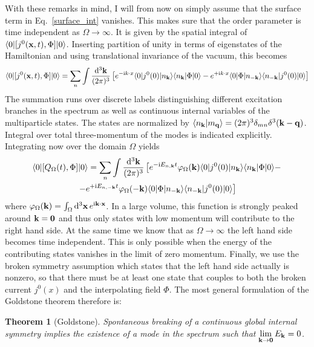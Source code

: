 \documentclass[final,2p,times,12pt,sort&compress]{elsarticle}
\newcommand\vek[1]{{\boldsymbol{\bf #1}}}   %
\newcommand\skal[2]{\vek{#1}\cdot\vek{#2}}  %
\newcommand\bra[1]{\langle#1\vert}          %
\newcommand\ket[1]{\vert#1\rangle}          %
\newcommand\braket[2]{\langle#1\vert#2\rangle} %
\newcommand\imag{\mathrm i}                 %
\newcommand\thname{Theorem}
\newtheorem{theorem}{\thname}
\newcommand\vp{\varphi}
\newcommand\dthree{\mathop{{\rm d}^3\!}\nolimits} %
\begin{document}
With these remarks in mind, I will from now on simply assume that the surface
term in Eq.~\eqref{surface_int} vanishes. This makes sure that the order
parameter is time independent as $\Omega\to\infty$. It is given by the spatial
integral of $\bra0[j^0(\vek x,t),\Phi]\ket0$. Inserting partition of unity in
terms of eigenstates of the Hamiltonian and using translational invariance of
the vacuum, this becomes
\begin{equation}
\bra0[j^0(\vek x,t),\Phi]\ket0=\sum_n\int\frac{\dthree\vek k}{(2\pi)^3}
\left[e^{-\imag k\cdot x}\bra0j^0(0)\ket{n_{\vek k}}\bra{n_{\vek k}}\Phi\ket0-
e^{+\imag k\cdot x}\bra0\Phi\ket{n_{-\vek k}}\bra{n_{-\vek k}}j^0(0)\ket0
\right]
\label{Goldstone_proof}
\end{equation}
The summation runs over discrete labels distinguishing different excitation
branches in the spectrum as well as continuous internal variables of the
multiparticle states. The states are normalized by $\braket{n_{\vek k}}{m_{\vek
q}}=(2\pi)^3\delta_{mn}\delta^3(\vek k-\vek q)$. Integral over total
three-momentum of the modes is indicated explicitly. Integrating now over the
domain $\Omega$ yields
\begin{multline}
\bra0[Q_\Omega(t),\Phi]\ket0=\sum_n\int\frac{\dthree\vek k}{(2\pi)^3}
\left[e^{-\imag E_{n,\vek k}t}\vp_\Omega(\vek k)\bra0j^0(0)
\ket{n_{\vek k}}\bra{n_{\vek k}}\Phi\ket0-\right.\\
\left.-e^{+\imag E_{n,-\vek k}t}\vp_\Omega(-\vek k)
\bra0\Phi\ket{n_{-\vek k}}\bra{n_{-\vek k}}j^0(0)\ket0 \right]
\label{Goldstone_proof2}
\end{multline}
where $\vp_\Omega(\vek k)=\int_\Omega\dthree\vek x\,e^{\imag\skal kx}$. In a
large volume, this function is strongly peaked around $\vek k=\vek0$ and thus
only states with low momentum will contribute to the right hand side. At the
same time we know that as $\Omega\to\infty$ the left hand side becomes time
independent. This is only possible when the energy of the contributing states
vanishes in the limit of zero momentum. Finally, we use the broken symmetry
assumption which states that the left hand side actually is nonzero, so that
there must be at least one state that couples to both the broken current
$j^0(x)$ and the interpolating field $\Phi$. The most general formulation of
the Goldstone theorem therefore is:
\begin{theorem}[Goldstone]
Spontaneous breaking of a continuous global internal symmetry implies the
existence of a mode in the spectrum such that $\lim\limits_{\vek
k\to\vek0}E_{\vek k}=0$.
\end{theorem}
\end{document}
